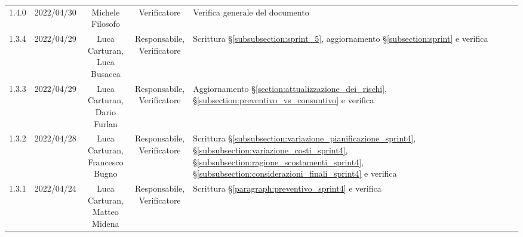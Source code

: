 \begin{center}
\begin{longtable}[c]{c | c | c | c | p{5cm}}
		1.4.0                                                      & 2022/04/30 & Michele Filosofo                       & Verificatore   & Verifica generale del documento                                                                                                           \\
		1.3.4                                                      & 2022/04/29 & \Shortunderstack{Luca Carturan,                                                                                                                                                                     \\Luca Busacca} & \Shortunderstack{Responsabile,\\Verificatore} & Scrittura §\ref{subsubsection:sprint_5}, aggiornamento §\ref{subsection:sprint} e verifica\\
		1.3.3                                                      & 2022/04/29 & \Shortunderstack{Luca Carturan,                                                                                                                                                                     \\Dario Furlan} & \Shortunderstack{Responsabile,\\Verificatore} & Aggiornamento §\ref{section:attualizzazione_dei_rischi}, §\ref{subsection:preventivo_vs_consuntivo} e verifica\\
		1.3.2                                                      & 2022/04/28 & \Shortunderstack{Luca Carturan,                                                                                                                                                                     \\Francesco Bugno} & \Shortunderstack{Responsabile,\\Verificatore} & Scrittura §\ref{subsubsection:variazione_pianificazione_sprint4}, §\ref{subsubsection:variazione_costi_sprint4}, §\ref{subsubsection:ragione_scostamenti_sprint4}, §\ref{subsubsection:considerazioni_finali_sprint4} e verifica\\
		1.3.1                                                      & 2022/04/24 & \Shortunderstack{Luca Carturan,                                                                                                                                                                     \\Matteo Midena} & \Shortunderstack{Responsabile,\\Verificatore} & Scrittura §\ref{paragraph:preventivo_sprint4} e verifica\\

\end{longtable}
\end{center}
